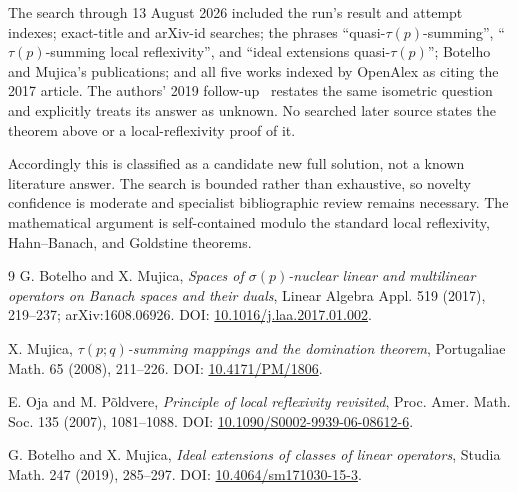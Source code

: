 \documentclass[11pt]{article}
\begin{document}
The search through 13 August 2026 included the run's result and attempt
indexes; exact-title and arXiv-id searches; the phrases
``quasi-$\tau(p)$-summing'', ``$\tau(p)$-summing local reflexivity'', and
``ideal extensions quasi-$\tau(p)$''; Botelho and Mujica's publications; and
all five works indexed by OpenAlex as citing the 2017 article.  The authors'
2019 follow-up~\cite{BM19} restates the same isometric question and explicitly
treats its answer as unknown.  No searched later source states the theorem
above or a local-reflexivity proof of it.

Accordingly this is classified as a candidate new full solution, not a known
literature answer.  The search is bounded rather than exhaustive, so novelty
confidence is moderate and specialist bibliographic review remains necessary.
The mathematical argument is self-contained modulo the standard local
reflexivity, Hahn--Banach, and Goldstine theorems.

\begin{thebibliography}{9}
G. Botelho and X. Mujica,
\emph{Spaces of $\sigma(p)$-nuclear linear and multilinear operators on
Banach spaces and their duals}, Linear Algebra Appl. 519 (2017), 219--237;
arXiv:1608.06926.  DOI: \href{https://doi.org/10.1016/j.laa.2017.01.002}{10.1016/j.laa.2017.01.002}.

X. Mujica,
\emph{$\tau(p;q)$-summing mappings and the domination theorem},
Portugaliae Math. 65 (2008), 211--226.
DOI: \href{https://doi.org/10.4171/PM/1806}{10.4171/PM/1806}.

E. Oja and M. P\~oldvere,
\emph{Principle of local reflexivity revisited},
Proc. Amer. Math. Soc. 135 (2007), 1081--1088.
DOI: \href{https://doi.org/10.1090/S0002-9939-06-08612-6}{10.1090/S0002-9939-06-08612-6}.

G. Botelho and X. Mujica,
\emph{Ideal extensions of classes of linear operators},
Studia Math. 247 (2019), 285--297.
DOI: \href{https://doi.org/10.4064/sm171030-15-3}{10.4064/sm171030-15-3}.
\end{thebibliography}
\end{document}
